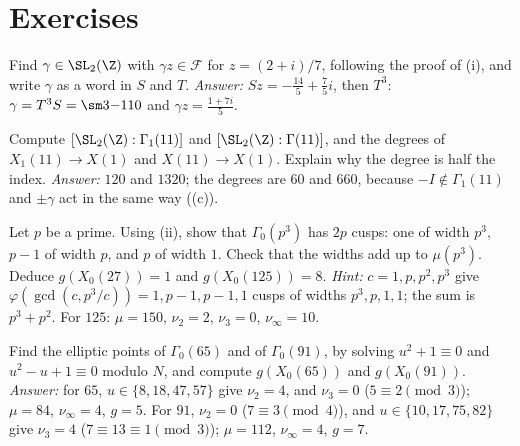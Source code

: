 \section{Exercises}\label{sec:modforms:exercises}

\begin{exercise}\label{ex:modforms:ex-reduce}
Find $\gamma\in\SL_2(\Z)$ with $\gamma z\in\mathcal F$ for $z=(2+i)/7$, following the proof of (i), and write $\gamma$ as a word in $S$ and $T$.
\emph{Answer:} $Sz=-\frac{14}5+\frac75i$, then $T^3$: $\gamma=T^3S=\sm3{-1}10$ and $\gamma z=\frac{1+7i}5$.
\end{exercise}

\begin{exercise}\label{ex:modforms:ex-gamma1}
Compute $[\SL_2(\Z):\Gamma_1(11)]$ and $[\SL_2(\Z):\Gamma(11)]$, and the degrees of $X_1(11)\to X(1)$ and $X(11)\to X(1)$. Explain why the degree is half the index.
\emph{Answer:} $120$ and $1320$; the degrees are $60$ and $660$, because $-I\notin\Gamma_1(11)$ and $\pm\gamma$ act in the same way ((c)).
\end{exercise}

\begin{exercise}\label{ex:modforms:ex-cusps-p3}
Let $p$ be a prime. Using (ii), show that $\Gamma_0(p^3)$ has $2p$ cusps: one of width $p^3$, $p-1$ of width $p$, and $p$ of width $1$. Check that the
widths add up to $\mu(p^3)$. Deduce $g(X_0(27))=1$ and $g(X_0(125))=8$.
\emph{Hint:} $c=1,p,p^2,p^3$ give $\varphi(\gcd(c,p^3/c))=1,p-1,p-1,1$ cusps of widths $p^3,p,1,1$; the sum is $p^3+p^2$. For $125$: $\mu=150$, $\nu_2=2$, $\nu_3=0$, $\nu_\infty=10$.
\end{exercise}

\begin{exercise}\label{ex:modforms:ex-elliptic}
Find the elliptic points of $\Gamma_0(65)$ and of $\Gamma_0(91)$, by solving $u^2+1\equiv0$ and $u^2-u+1\equiv0$ modulo $N$, and compute $g(X_0(65))$ and $g(X_0(91))$.
\emph{Answer:} for $65$, $u\in\{8,18,47,57\}$ give $\nu_2=4$, and $\nu_3=0$ ($5\equiv2\pmod3$); $\mu=84$, $\nu_\infty=4$, $g=5$. For $91$, $\nu_2=0$ ($7\equiv3\pmod4$), and
$u\in\{10,17,75,82\}$ give $\nu_3=4$ ($7\equiv13\equiv1\pmod3$); $\mu=112$, $\nu_\infty=4$, $g=7$.
\end{exercise}

